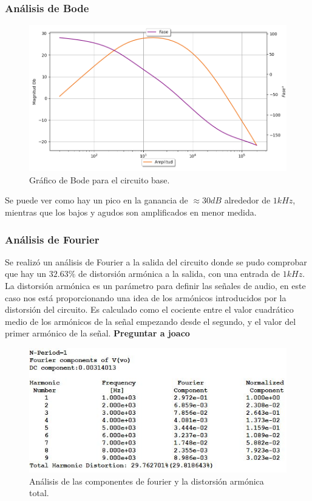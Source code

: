 \subsubsection{Análisis de Bode}

\begin{figure}[H]
	\centering
	\includegraphics[width=1\textwidth, trim={0 0 0 0}, clip]{Ejercicio5/Imagenes/Circuito_base/Sim/circuito_base_bode.png}
	\caption{Gráfico de Bode para el circuito base.}
	\label{fig:sim_base}
\end{figure}

Se puede ver como hay un pico en la ganancia de $\approx 30dB$ alrededor de $1kHz$, mientras que los bajos y agudos son amplificados en menor medida.

\subsubsection{Análisis de Fourier}

Se realizó un análisis de Fourier a la salida del circuito donde se pudo comprobar que hay un $32.63\%$ de distorsión armónica a la salida, con una entrada de $1kHz$. La distorsión armónica es un parámetro para definir las señales de audio, en este caso nos está proporcionando una idea de los armónicos introducidos por la distorsión del circuito. Es calculado como el cociente entre el valor cuadrático medio de los armónicos de la señal empezando desde el segundo, y el valor del primer armónico de la señal. \textbf{Preguntar a joaco}
\begin{figure}[H]
	\centering
	\includegraphics[width=1\textwidth, trim={0 0 0 0}, clip]{Ejercicio5/Imagenes/Circuito_base/Sim/sim_base_fourier.JPG}
	\caption{Análisis de las componentes de fourier y la distorsión armónica total.}
	\label{fig:sim_base_fourier}
\end{figure}

